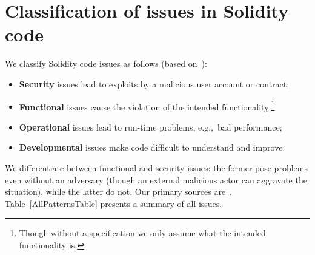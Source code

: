 \section {Classification of issues in Solidity code}

We classify Solidity code issues as follows (based on~\cite{Henney2003}):
\begin{itemize}
	\item \textbf{Security} issues lead to exploits by a malicious user account or contract;
	\item \textbf{Functional} issues cause the violation of the intended functionality;\footnote{Though without a specification we only assume what the intended functionality is.}
	\item \textbf{Operational} issues lead to run-time problems, e.g.,~bad performance;
	\item \textbf{Developmental} issues make code difficult to understand and improve.
\end{itemize}
We differentiate between functional and security issues: the former pose problems even without an adversary (though an external malicious actor can aggravate the situation), while the latter do not. Our primary sources are~\cite{Consensys2016, Solidity2017, Atzei2017, Delmolino2016, Chen2017, OpenZeppelin2017a}.
Table~\ref{AllPatternsTable} presents a summary of all issues.


